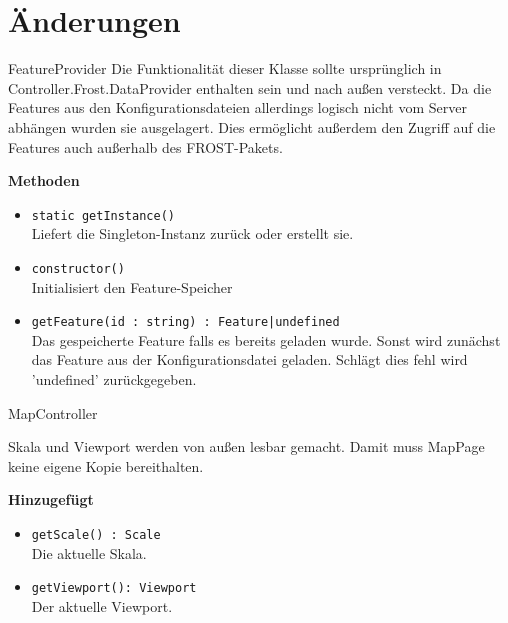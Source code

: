\section{Änderungen}
\begin{Change}{FeatureProvider}
    Die Funktionalität dieser Klasse sollte ursprünglich in 
    Controller.Frost.DataProvider enthalten sein und nach außen versteckt. 
    Da die Features aus den Konfigurationsdateien allerdings logisch nicht 
    vom Server abhängen wurden sie ausgelagert. Dies ermöglicht außerdem den 
    Zugriff auf die Features auch außerhalb des FROST-Pakets.
    
    \bigskip
    \textbf{Methoden}
    \begin{itemize}
        \item \texttt{static getInstance()}
        \\ Liefert die Singleton-Instanz zurück oder erstellt sie.
        \item \texttt{constructor()}
        \\ Initialisiert den Feature-Speicher
        \item \texttt{getFeature(id : string) : Feature|undefined}
        \\ Das gespeicherte Feature falls es bereits geladen wurde.
        Sonst wird zunächst das Feature aus der Konfigurationsdatei geladen.
        Schlägt dies fehl wird 'undefined' zurückgegeben.
    \end{itemize}
\end{Change}

\begin{Change}{MapController}
    
    Skala und Viewport werden von außen lesbar gemacht.
    Damit muss MapPage keine eigene Kopie bereithalten.

    \bigskip
    \textbf{Hinzugefügt}
    \begin{itemize}
        \item \texttt{getScale() : Scale}
        \\ Die aktuelle Skala.
        \item \texttt{getViewport(): Viewport}
        \\ Der aktuelle Viewport.
    \end{itemize}

\end{Change}

